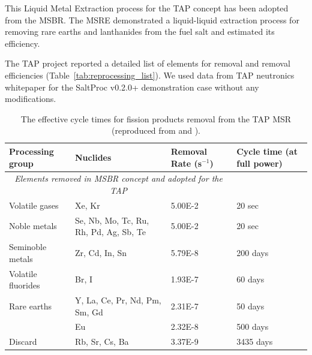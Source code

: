 \documentclass[12pt]{article} %
\begin{document}
This Liquid Metal Extraction process for the \gls{TAP} concept has been 
adopted from the \gls{MSBR}. The \gls{MSRE} demonstrated a liquid-liquid 
extraction process for removing rare earths and lanthanides from the fuel salt 
and estimated its efficiency.

The \gls{TAP} project reported a detailed list of elements for removal and 
removal efficiencies (Table~\ref{tab:reprocessing_list}). We used data from 
\gls{TAP} neutronics 
whitepaper\cite{transatomic_power_corporation_neutronics_2016} for the 
SaltProc v0.2.0+  demonstration case without any modifications.
\begin{table}[ht!]
        \centering
        \caption{The effective cycle times for fission products removal from 
        the \gls{TAP} \gls{MSR} (reproduced from 
        \cite{betzler_implementation_2017} and 
        \cite{transatomic_power_corporation_neutronics_2016}).}
        \begin{tabular}{p{} p{} p{} p{}}
        \hline 
        Processing group & \qquad\qquad\qquad Nuclides & Removal Rate (s$^{-1}$) & Cycle time (at full power) \\ [5pt] \hline 
 \multicolumn{3}{c}{\textit{Elements removed in \gls{MSBR} concept and adopted for the \gls{TAP}} \cite{robertson_conceptual_1971}} \\
        Volatile gases & Xe, Kr								  & 5.00E-2 & 20 sec \\ [5pt]
        Noble metals & Se, Nb, Mo, Tc, Ru, Rh, Pd, Ag, Sb, Te & 5.00E-2 & 20 sec \\ [5pt]
        Seminoble metals & Zr, Cd, In, Sn	  				  & 5.79E-8 & 200 days \\ [5pt]
        Volatile fluorides & Br, I 							  & 1.93E-7 & 60 days \\ [5pt]
        Rare earths & Y, La, Ce, Pr, Nd, Pm, Sm, Gd           & 2.31E-7 & 50 days \\ [5pt]
        \qquad & Eu & 2.32E-8 & 500 days \\ [5pt]
        Discard & Rb, Sr, Cs, Ba & 3.37E-9 & 3435 days \\ [5pt] 
        \hline
 

\end{tabular}
\end{table}
\end{document}
